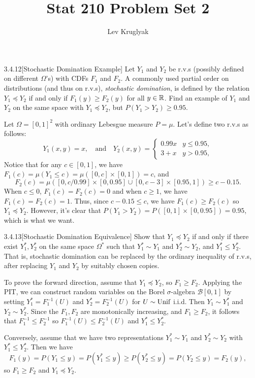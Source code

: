 \documentclass{pset}
\title{Stat 210 Problem Set 2}
\author{Lev Kruglyak}
\begin{document}
\maketitle
\collaborators

\begin{problem}{3.4.12}[Stochastic Domination Example]
  Let $Y_1$ and $Y_2$ be r.v.s (possibly defined on different $\Omega$'s) with CDFs $F_1$ and $F_2$.
  A commonly used partial order on distributions (and thus on r.v.s), \emph{stochastic domination}, is defined by the relation $Y_1 \preceq Y_2$ if and only if $F_1(y)\geq F_2(y)$ for all $y\in \mathbb{R}$. Find an example of $Y_1$ and $Y_2$ on the same space with $Y_1\preceq Y_2$, but $P(Y_1 > Y_2) \geq 0.95$. %
\end{problem}

\begin{solution}
  Let $\Omega=[0,1]^2$ with ordinary Lebesgue measure $P=\mu$. Let's define two r.v.s as follows:
  \[
    Y_1(x,y) = x,\quad\textrm{and}\quad Y_2(x,y)=\begin{cases}0.99x &y\leq 0.95,\\ 3+x&y>0.95,\end{cases}
  \]
  Notice that for any $c\in [0,1]$, we have $F_1(c) = \mu(Y_1 \leq c) = \mu([0,c]\times [0,1]) = c$, and 
  \[
    F_2(c) = \mu([0,c/0.99]\times [0,0.95] \cup [0, c-3]\times [0.95, 1]) \geq c-0.15.
  \]
  When $c\leq 0$, $F_1(c)=F_2(c)=0$ and when $c\geq 1$, we have $F_1(c)=F_2(c)=1$. Thus, since $c-0.15 \leq c$, we have $F_1(c) \geq F_2(c)$ so $Y_1 \preceq Y_2$. However, it's clear that $P(Y_1 > Y_2) = P([0,1]\times [0,0.95]) = 0.95$, which is what we want. 
\end{solution}

\begin{problem}{3.4.13}[Stochastic Domination Equivalence]
  Show that $Y_1 \preceq Y_2$ if and only if there exist $Y_1^*, Y_2^*$ on the same space $\Omega^*$ such that $Y_1^* \sim Y_1$ and $Y_2^* \sim Y_2$, and $Y_1^* \leq Y_2^*$. That is, stochastic domination can be replaced by the ordinary inequality of r.v.s, after replacing $Y_1$ and $Y_2$ by suitably chosen copies. 
\end{problem}

\begin{solution}
  To prove the forward direction, assume that $Y_1 \preceq Y_2$, so $F_1 \geq F_2$. Applying the PIT, we can construct random variables on the Borel $\sigma$-algebra $\mathcal{B}[0,1]$ by setting $Y_1^* = F_1^{-1}(U)$ and $Y_2^* = F_2^{-1}(U)$ for $U\sim \textrm{Unif}$ i.i.d. Then $Y_1\sim Y_1^*$ and $Y_2 \sim Y_2^*$. Since the $F_1, F_2$ are monotonically increasing,
  and $F_1 \geq F_2$, it follows that $F_1^{-1} \leq F_2^{-1}$ so $F_1^{-1}(U)\leq F_2^{-1}(U)$ and $Y_1^* \leq Y_2^*$.

  Conversely, assume that we have two representations $Y_1^* \sim Y_1$ and $Y_2^* \sim Y_2$ with $Y_1^* \leq Y_2^*$. Then we have
  \[
    F_1(y)=P(Y_1\leq y) = P(Y_1^* \leq y) \geq P(Y_2^* \leq y) = P(Y_2 \leq y) = F_2(y),
  \]
  so $F_1 \geq F_2$ and $Y_1\preceq Y_2$. 
\end{solution}
\end{document}
